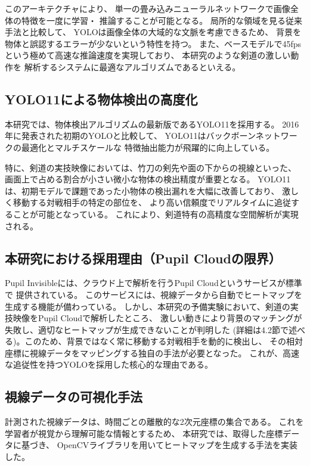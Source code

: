 \documentclass[dvipdfmx]{ujreport}
\begin{document}
    このアーキテクチャにより、
    単一の畳み込みニューラルネットワークで画像全体の特徴を一度に学習・
    推論することが可能となる。
    局所的な領域を見る従来手法と比較して、
    YOLOは画像全体の大域的な文脈を考慮できるため、
    背景を物体と誤認するエラーが少ないという特性を持つ。
    また、ベースモデルで45fpsという極めて高速な推論速度を実現しており、
    本研究のような剣道の激しい動作を
    解析するシステムに最適なアルゴリズムであるといえる。

    \subsection{YOLO11による物体検出の高度化}
    本研究では、物体検出アルゴリズムの最新版であるYOLO11を採用する。
    2016年に発表された初期のYOLOと比較して、
    YOLO11はバックボーンネットワークの最適化とマルチスケールな
    特徴抽出能力が飛躍的に向上している。
    
    特に、剣道の実技映像においては、竹刀の剣先や面の下からの視線といった、
    画面上で占める割合が小さい微小な物体の検出精度が重要となる。
    YOLO11は、初期モデルで課題であった小物体の検出漏れを大幅に改善しており、
    激しく移動する対戦相手の特定の部位を、
    より高い信頼度でリアルタイムに追従することが可能となっている。
    これにより、剣道特有の高精度な空間解析が実現される。

\subsection{本研究における採用理由（Pupil Cloudの限界）}
    Pupil Invisibleには、クラウド上で解析を行うPupil Cloudというサービスが標準で
    提供されている。
    このサービスには、視線データから自動でヒートマップを生成する機能が備わっている。
    しかし、本研究の予備実験において、剣道の実技映像をPupil Cloudで解析したところ、
    激しい動きにより背景のマッチングが失敗し、適切なヒートマップが生成できないことが判明した
    (詳細は4.2節で述べる)。このため、背景ではなく常に移動する対戦相手を動的に検出し、
    その相対座標に視線データをマッピングする独自の手法が必要となった。
    これが、高速な追従性を持つYOLOを採用した核心的な理由である。

    \subsection{視線データの可視化手法}
    計測された視線データは、時間ごとの離散的な2次元座標の集合である。
    これを学習者が視覚から理解可能な情報とするため、
    本研究では、取得した座標データに基づき、
    OpenCVライブラリを用いてヒートマップを生成する手法を実装した。
\end{document}

